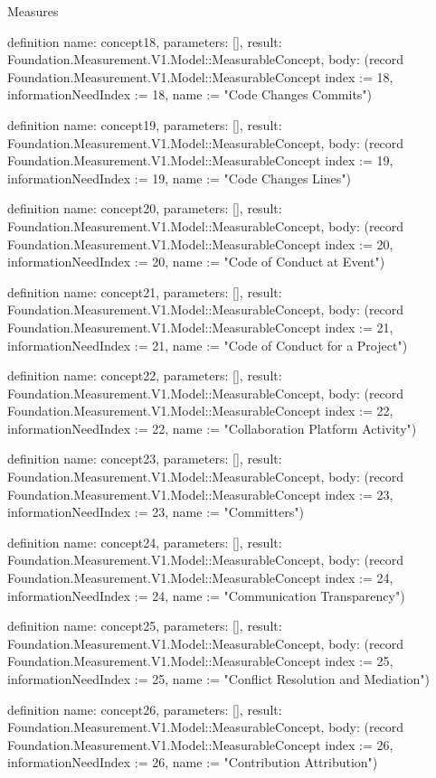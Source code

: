 \begin{lexlean}{Measures}
\begin{semanticmodule}
definition{
  name: concept18,
  parameters: [],
  result: Foundation.Measurement.V1.Model::MeasurableConcept,
  body: (record Foundation.Measurement.V1.Model::MeasurableConcept {index := 18, informationNeedIndex := 18, name := "Code Changes Commits"})
}

definition{
  name: concept19,
  parameters: [],
  result: Foundation.Measurement.V1.Model::MeasurableConcept,
  body: (record Foundation.Measurement.V1.Model::MeasurableConcept {index := 19, informationNeedIndex := 19, name := "Code Changes Lines"})
}

definition{
  name: concept20,
  parameters: [],
  result: Foundation.Measurement.V1.Model::MeasurableConcept,
  body: (record Foundation.Measurement.V1.Model::MeasurableConcept {index := 20, informationNeedIndex := 20, name := "Code of Conduct at Event"})
}

definition{
  name: concept21,
  parameters: [],
  result: Foundation.Measurement.V1.Model::MeasurableConcept,
  body: (record Foundation.Measurement.V1.Model::MeasurableConcept {index := 21, informationNeedIndex := 21, name := "Code of Conduct for a Project"})
}

definition{
  name: concept22,
  parameters: [],
  result: Foundation.Measurement.V1.Model::MeasurableConcept,
  body: (record Foundation.Measurement.V1.Model::MeasurableConcept {index := 22, informationNeedIndex := 22, name := "Collaboration Platform Activity"})
}

definition{
  name: concept23,
  parameters: [],
  result: Foundation.Measurement.V1.Model::MeasurableConcept,
  body: (record Foundation.Measurement.V1.Model::MeasurableConcept {index := 23, informationNeedIndex := 23, name := "Committers"})
}

definition{
  name: concept24,
  parameters: [],
  result: Foundation.Measurement.V1.Model::MeasurableConcept,
  body: (record Foundation.Measurement.V1.Model::MeasurableConcept {index := 24, informationNeedIndex := 24, name := "Communication Transparency"})
}

definition{
  name: concept25,
  parameters: [],
  result: Foundation.Measurement.V1.Model::MeasurableConcept,
  body: (record Foundation.Measurement.V1.Model::MeasurableConcept {index := 25, informationNeedIndex := 25, name := "Conflict Resolution and Mediation"})
}

definition{
  name: concept26,
  parameters: [],
  result: Foundation.Measurement.V1.Model::MeasurableConcept,
  body: (record Foundation.Measurement.V1.Model::MeasurableConcept {index := 26, informationNeedIndex := 26, name := "Contribution Attribution"})
}


\end{semanticmodule}
\end{lexlean}
